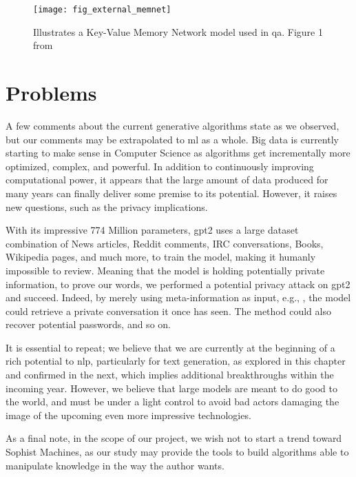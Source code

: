 \begin{figure}
    \centering
    \texttt{[image: fig\_external\_memnet]}
    \caption{Illustrates a Key-Value Memory Network model used in \gls{qa}. Figure 1 from \autocite{paper:journals/corr/MillerFDKBW16}}
    \label{fig:fig_external_memnet}
\end{figure}

\section{Problems}
A few comments about the current generative algorithms state as we observed, but our comments may be extrapolated to \gls{ml} as a whole. Big data is currently starting to make sense in Computer Science as algorithms get incrementally more optimized, complex, and powerful. In addition to continuously improving computational power, it appears that the large amount of data produced for many years can finally deliver some premise to its potential. However, it raises new questions, such as the privacy implications. 

With its impressive 774 Million parameters, \gls{gpt2} uses a large dataset combination of News articles, Reddit comments, IRC conversations, Books, Wikipedia pages, and much more, to train the model, making it humanly impossible to review. Meaning that the model is holding potentially private information, to prove our words, we performed a potential privacy attack on \gls{gpt2} and succeed. Indeed, by merely using meta-information as input, e.g., , the model could retrieve a private conversation it once has seen. The method could also recover potential passwords, and so on.

It is essential to repeat; we believe that we are currently at the beginning of a rich potential to \gls{nlp}, particularly for text generation, as explored in this chapter and confirmed in the next, which implies additional breakthroughs within the incoming year. However, we believe that large models are meant to do good to the world, and must be under a light control to avoid bad actors damaging the image of the upcoming even more impressive technologies.

As a final note, in the scope of our project, we wish not to start a trend toward Sophist Machines, as our study may provide the tools to build algorithms able to manipulate knowledge in the way the author wants.

